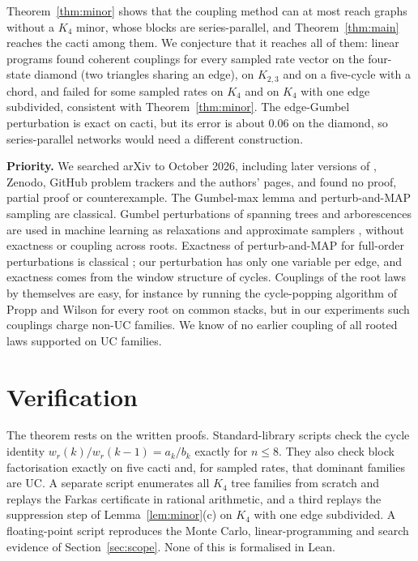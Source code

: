 \documentclass[11pt]{amsart}
\theoremstyle{definition}
\theoremstyle{remark}
\begin{document}
Theorem~\ref{thm:minor} shows that the coupling method can at most reach graphs without a $K_4$ minor, whose blocks are series-parallel, and Theorem~\ref{thm:main} reaches the cacti among them. We conjecture that it reaches all of them: linear programs found coherent couplings for every sampled rate vector on the four-state diamond (two triangles sharing an edge), on $K_{2,3}$ and on a five-cycle with a chord, and failed for some sampled rates on $K_4$ and on $K_4$ with one edge subdivided, consistent with Theorem~\ref{thm:minor}. The edge-Gumbel perturbation is exact on cacti, but its error is about $0.06$ on the diamond, so series-parallel networks would need a different construction.

\textbf{Priority.} We searched arXiv to October 2026, including later versions of \cite{FH2026}, Zenodo, GitHub problem trackers and the authors' pages, and found no proof, partial proof or counterexample. The Gumbel-max lemma \cite{Yellott1977} and perturb-and-MAP sampling \cite{PapandreouYuille2011,Maddison2014} are classical. Gumbel perturbations of spanning trees and arborescences are used in machine learning as relaxations and approximate samplers \cite{Paulus2020,Struminsky2021}, without exactness or coupling across roots. Exactness of perturb-and-MAP for full-order perturbations is classical \cite{HazanJaakkola2012}; our perturbation has only one variable per edge, and exactness comes from the window structure of cycles. Couplings of the root laws by themselves are easy, for instance by running the cycle-popping algorithm of Propp and Wilson \cite{ProppWilson1998} for every root on common stacks, but in our experiments such couplings charge non-UC families. We know of no earlier coupling of all rooted laws supported on UC families.

\section{Verification}

The theorem rests on the written proofs. Standard-library scripts check the cycle identity $w_r(k)/w_r(k-1)=a_k/b_k$ exactly for $n\le8$. They also check block factorisation exactly on five cacti and, for sampled rates, that dominant families are UC. A separate script enumerates all $K_4$ tree families from scratch and replays the Farkas certificate in rational arithmetic, and a third replays the suppression step of Lemma~\ref{lem:minor}(c) on $K_4$ with one edge subdivided. A floating-point script reproduces the Monte Carlo, linear-programming and search evidence of Section~\ref{sec:scope}. None of this is formalised in Lean.



\end{document}
